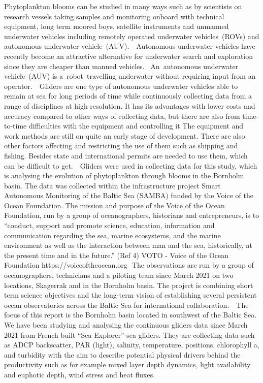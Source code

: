 \documentclass[../Main.tex]{subfiles}
\begin{document}
Phytoplankton blooms can be studied in many ways such as by scientists on research vessels taking samples and monitoring onboard with technical equipment, long term moored boys, satellite instruments and unmanned underwater vehicles including remotely operated underwater vehicles (ROVs) and autonomous underwater vehicle (AUV).    Autonomous underwater vehicles have recently become an attractive alternative for underwater search and exploration since they are cheaper than manned vehicles.  An autonomous underwater vehicle (AUV) is a robot travelling underwater without requiring input from an operator.   Gliders are one type of autonomous underwater vehicles able to remain at sea for long periods of time while continuously collecting data from a range of disciplines at high resolution. It has its advantages with lower costs and accuracy compared to other ways of collecting data, but there are also from time-to-time difficulties with the equipment and controlling it The equipment and work methods are still on quite an early stage of development. There are also other factors affecting and restricting the use of them such as shipping and fishing. Besides state and international permits are needed to use them, which can be difficult to get.   Gliders were used in collecting data for this study, which is analysing the evolution of phytoplankton through blooms in the Bornholm basin. The data was collected within the infrastructure project Smart Autonomous Monitoring of the Baltic Sea (SAMBA) funded by the Voice of the Ocean Foundation. 
The mission and purpose of the Voice of the Ocean Foundation, run by a group of oceanographers, historians and entrepreneurs, is to “conduct, support and promote science, education, information and communication regarding the sea, marine ecosystems, and the marine environment as well as the interaction between man and the sea, historically, at the present time and in the future.”  (Ref 4) VOTO - Voice of the Ocean Foundation https://voiceoftheocean.org  The observations are run by a group of oceanographers, technicians and a piloting team since March 2021 on two locations, Skagerrak and in the Bornholm basin. The project is combining short term science objectives and the long-term vision of establishing several persistent ocean observatories across the Baltic Sea for international collaboration.   The focus of this report is the Bornholm basin located in southwest of the Baltic Sea. We have been studying and analysing the continuous gliders data since March 2021 from French built “Sea Explorer” sea gliders. They are collecting data such as ADCP backscatter, PAR (light), salinity, temperature, positions, chlorophyll a, and turbidity with the aim to describe potential physical drivers behind the productivity such as for example mixed layer depth dynamics, light availability and euphotic depth, wind stress and heat fluxes. 
\end{document}
